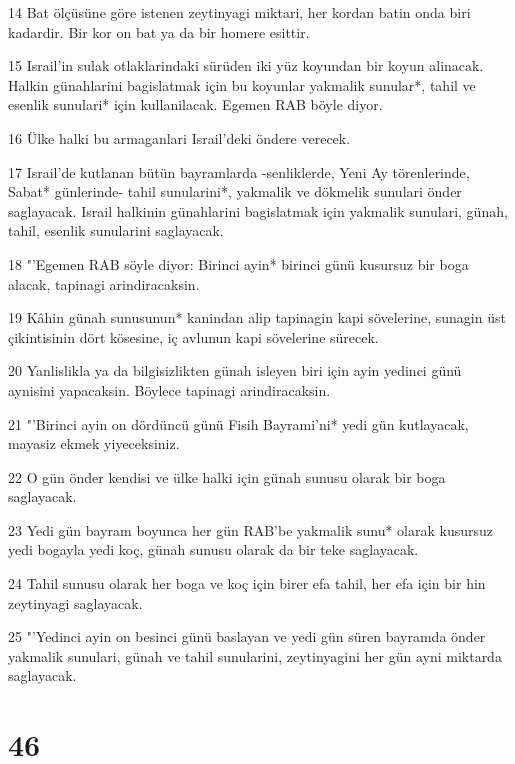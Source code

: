 \par 14 Bat ölçüsüne göre istenen zeytinyagi miktari, her kordan batin onda biri kadardir. Bir kor on bat ya da bir homere esittir.
\par 15 Israil'in sulak otlaklarindaki sürüden iki yüz koyundan bir koyun alinacak. Halkin günahlarini bagislatmak için bu koyunlar yakmalik sunular*, tahil ve esenlik sunulari* için kullanilacak. Egemen RAB böyle diyor.
\par 16 Ülke halki bu armaganlari Israil'deki öndere verecek.
\par 17 Israil'de kutlanan bütün bayramlarda -senliklerde, Yeni Ay törenlerinde, Sabat* günlerinde- tahil sunularini*, yakmalik ve dökmelik sunulari önder saglayacak. Israil halkinin günahlarini bagislatmak için yakmalik sunulari, günah, tahil, esenlik sunularini saglayacak.
\par 18 "'Egemen RAB söyle diyor: Birinci ayin* birinci günü kusursuz bir boga alacak, tapinagi arindiracaksin.
\par 19 Kâhin günah sunusunun* kanindan alip tapinagin kapi sövelerine, sunagin üst çikintisinin dört kösesine, iç avlunun kapi sövelerine sürecek.
\par 20 Yanlislikla ya da bilgisizlikten günah isleyen biri için ayin yedinci günü aynisini yapacaksin. Böylece tapinagi arindiracaksin.
\par 21 "'Birinci ayin on dördüncü günü Fisih Bayrami'ni* yedi gün kutlayacak, mayasiz ekmek yiyeceksiniz.
\par 22 O gün önder kendisi ve ülke halki için günah sunusu olarak bir boga saglayacak.
\par 23 Yedi gün bayram boyunca her gün RAB'be yakmalik sunu* olarak kusursuz yedi bogayla yedi koç, günah sunusu olarak da bir teke saglayacak.
\par 24 Tahil sunusu olarak her boga ve koç için birer efa tahil, her efa için bir hin zeytinyagi saglayacak.
\par 25 "'Yedinci ayin on besinci günü baslayan ve yedi gün süren bayramda önder yakmalik sunulari, günah ve tahil sunularini, zeytinyagini her gün ayni miktarda saglayacak.

\chapter{46}

